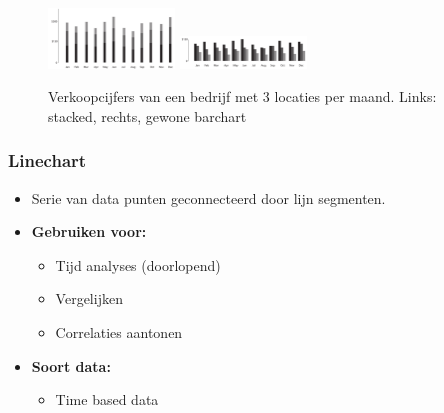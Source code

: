 \documentclass{article}
\newcommand{\bold}[1]{\textbf{#1}}
\begin{document}
\begin{figure}[H]
    \centering
    \includegraphics[width=0.3\textwidth]{dv-stackedbarchart7.png}
    \includegraphics[width=0.3\textwidth]{dv-stackedbarchart6.png}
    \caption{Verkoopcijfers van een bedrijf met 3 locaties per maand. Links: stacked, rechts, gewone barchart}
\end{figure}

\subsubsection{Linechart}

\begin{itemize}
    \item Serie van data punten geconnecteerd door lijn segmenten.
    \item \bold{Gebruiken voor:}
    \begin{itemize}
        \item Tijd analyses (doorlopend)
        \item Vergelijken
        \item Correlaties aantonen
    \end{itemize}
    \item \bold{Soort data:}
    \begin{itemize}
        \item Time based data
    \end{itemize}
\end{itemize}
\end{document}
